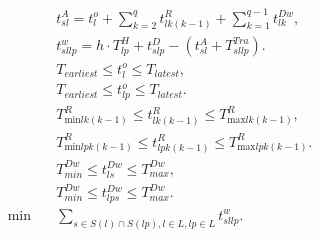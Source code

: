 \begin{align}
  & t_{\mathit{sl}}^{A} = t_{l}^{o} + \sum_{k = 2}^{q} t_{\mathit{lk} \left(k - 1\right)}^{R} + \sum_{k = 1}^{q - 1} t_{\mathit{lk}}^{\mathit{Dw}} , \tag{eq\_0003} \\
  & t_{sllp}^{w} = h \cdot T_{lp}^{H} + t_{slp}^{D} - \left(t_{\mathit{sl}}^{A} + T_{sllp}^{\mathit{Tra}}\right) . \tag{eq\_0005} \\
  & T_{\mathit{earliest}} \leq t_{l}^{o} \leq T_{\mathit{latest}} , \tag{eq\_0006} \\
  & T_{\mathit{earliest}} \leq t_{lp}^{o} \leq T_{\mathit{latest}} . \tag{eq\_0007} \\
  & T_{\text{min} \mathit{lk} \left(k - 1\right)}^{R} \leq t_{\mathit{lk} \left(k - 1\right)}^{R} \leq T_{\text{max} \mathit{lk} \left(k - 1\right)}^{R} , \tag{eq\_0008} \\
  & T_{\text{min} lp k \left(k - 1\right)}^{R} \leq t_{lp k \left(k - 1\right)}^{R} \leq T_{\text{max} lp k \left(k - 1\right)}^{R} . \tag{eq\_0009} \\
  & T_{min}^{\mathit{Dw}} \leq t_{\mathit{ls}}^{\mathit{Dw}} \leq T_{max}^{\mathit{Dw}} , \tag{eq\_0010} \\
  & T_{min}^{\mathit{Dw}} \leq t_{lp s}^{\mathit{Dw}} \leq T_{max}^{\mathit{Dw}} . \tag{eq\_0011} \\
  \min\quad & \sum_{s \in S \left(l\right) \cap S \left(lp\right), l \in L, lp \in L} t_{sllp}^{w} . \tag{eq\_0012} \\
\end{align}
